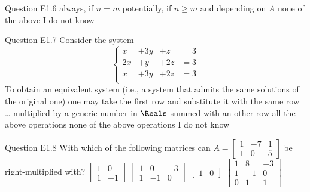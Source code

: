\begin{frame}{Question E1.6}
	\QuestionAnswers
	{
		\answer always, if $n=m$
		\correctanswer potentially, if $n\geq m$ and depending on $A$
		\answer none of the above
		\answer I do not know
	}
	\QuestionSolution{}
	\QuestionAuthor{}
	\QuestionVersion{}
\end{frame}


\begin{frame}{Question E1.7}
	\QuestionBody
	{
		Consider the system
		$$
		\left\lbrace
		\begin{array}{rrrl}
			x & + 3 y & + z & = 3 \\
			2 x & + y & + 2 z & = 3 \\
			x & + 3 y & + 2 z & = 3 \\
		\end{array}
		\right.
		$$
		To obtain an equivalent system (i.e., a system that admits the same solutions of the original one) one may take the first row and substitute it with the same row \ldots
	}
	\QuestionAnswers
	{
		\answer multiplied by a generic number in $\Reals$
		\answer summed with an other row
		\correctanswer all the above operations
		\answer none of the above operations
		\answer I do not know
	}
	\QuestionSolution{}
	\QuestionAuthor{}
	\QuestionVersion{}
\end{frame}


\begin{frame}{Question E1.8}
	\QuestionBody
	{
		With which of the following matrices can
		$A=\begin{bmatrix} 1 & -7 & 1\\ 1 & 0 & 5\end{bmatrix}$
		be right-multiplied with?
	}
	\QuestionAnswers
	{
		\answer $\begin{bmatrix} 1 & 0 \\ 1 & -1 \end{bmatrix}$
		\answer $\begin{bmatrix} 1 & 0 & -3 \\ 1 & -1 & 0 \end{bmatrix}$
		\answer $\begin{bmatrix} 1 & 0 \end{bmatrix}$
		\correctanswer $\begin{bmatrix} 1 & 8 & -3 \\ 1 & -1 & 0 \\ 0 & 1 & 1\end{bmatrix}$
	}
	\QuestionSolution{}
	\QuestionAuthor{}
	\QuestionVersion{}
\end{frame}


